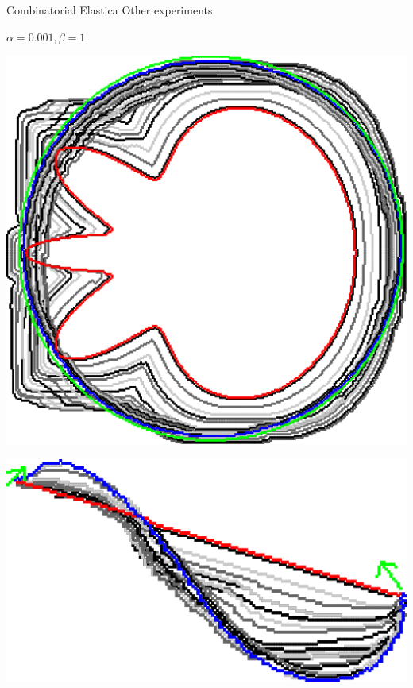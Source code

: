 \begin{frame}
	{Combinatorial Elastica}
	{Other experiments}
\begin{center}
$\alpha=0.001, \beta=1$	
\end{center}
\begin{minipage}{0.49\textwidth}
\center
\includegraphics[scale=0.25]{figures/combinatorial-elastica/other-experiments/ii/elastica/len_pen_0.001000/jonctions_1/curve_segs_4/best/gs_0.25000/flower.png}
\end{minipage}
\begin{minipage}{0.49\textwidth}
\center
\includegraphics[scale=0.25]{figures/combinatorial-elastica/other-experiments/ii/elastica/len_pen_0.001000/jonctions_1/curve_segs_4/best/gs_0.25000/curve.png}
\end{minipage}
\end{frame}

